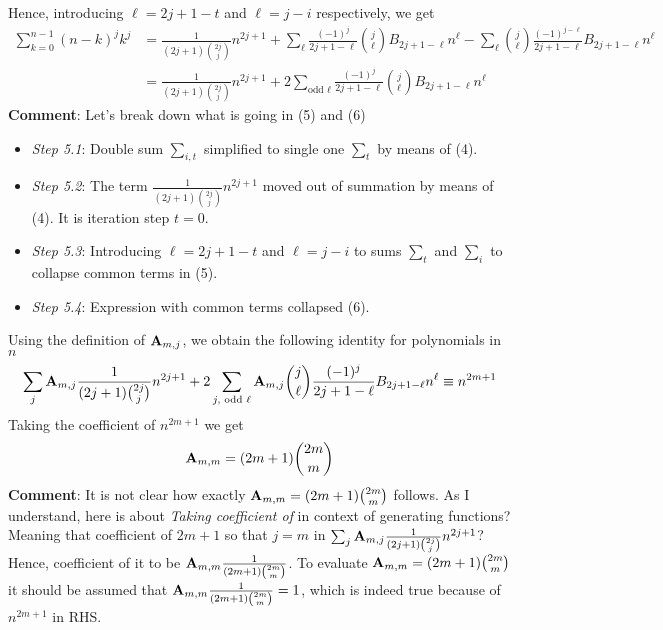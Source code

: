 Hence, introducing $\ell=2j+1-t$ and $\ell = j-i$ respectively, we get
\begin{align}
    \sum_{k=0}^{n-1} (n-k)^j k^j
    &= \frac{1}{(2j+1)\binom{2j}j} n^{2j+1} + \sum_{\ell} \frac{(-1)^j}{2j+1-\ell}\binom{j}{\ell}B_{2j+1-\ell}n^{\ell}
    - \sum_{\ell} \binom{j}{\ell} \frac{(-1)^{j-\ell}}{2j+1-\ell} B_{2j+1-\ell}n^{\ell} \\
    &=\frac{1}{(2j+1)\binom{2j}j} n^{2j+1} + 2\sum_{\text{odd }\ell} \frac{(-1)^j}{2j+1-\ell}\binom{j}{\ell}B_{2j+1-\ell}n^{\ell}
\end{align}
\textbf{Comment}: Let's break down what is going in (5) and (6)
\begin{itemize}
    \item \textit{Step 5.1}: Double sum $\sum_{i,t}$ simplified to single one $\sum_t$ by means of (4).
    \item \textit{Step 5.2}: The term $\frac{1}{(2j+1)\binom{2j}j} n^{2j+1}$ moved out of summation by means of (4).
    It is iteration step $t=0$.
    \item \textit{Step 5.3}: Introducing $\ell=2j+1-t$ and $\ell = j-i$ to sums $\sum_t$ and $\sum_i$ to collapse common terms in (5).
    \item \textit{Step 5.4}: Expression with common terms collapsed (6).
\end{itemize}
Using the definition of ${\mathbf{A}} \sb{m,j}$, we obtain the following identity for polynomials in $n$
\begin{align}
    \sum_{j} {\mathbf{A}} \sb{m,j} \frac{1}{(2j+1)\binom{2j}j}n^{2j+1}
    + 2 \sum_{j,\text{ odd }\ell} {\mathbf{A}} \sb{m,j} \binom{j}{\ell} \frac{(-1)^j}{2j+1-\ell} B_{2j+1-\ell}n^{\ell} \equiv n^{2m+1}
\end{align}
Taking the coefficient of $n^{2m+1}$ we get
\begin{align}
    {\mathbf{A}} \sb{m,m} = (2m+1)\binom{2m}{m}
\end{align}
\textbf{Comment}: It is not clear how exactly ${\mathbf{A}} \sb{m,m} = (2m+1)\binom{2m}{m}$ follows.
As I understand, here is about \textit{Taking coefficient of} in context of generating functions?
Meaning that coefficient of $2m+1$ so that $j=m$ in $\sum_{j} {\mathbf{A}} \sb{m,j} \frac{1}{(2j+1)\binom{2j}j}n^{2j+1}$?
Hence, coefficient of it to be ${\mathbf{A}} \sb{m,m} \frac{1}{(2m+1)\binom{2m}{m}}$.
To evaluate ${\mathbf{A}} \sb{m,m} = (2m+1)\binom{2m}{m}$ it should be assumed that ${\mathbf{A}} \sb{m,m} \frac{1}{(2m+1)\binom{2m}{m}} = 1$,
which is indeed true because of $n^{2m+1}$ in RHS.
